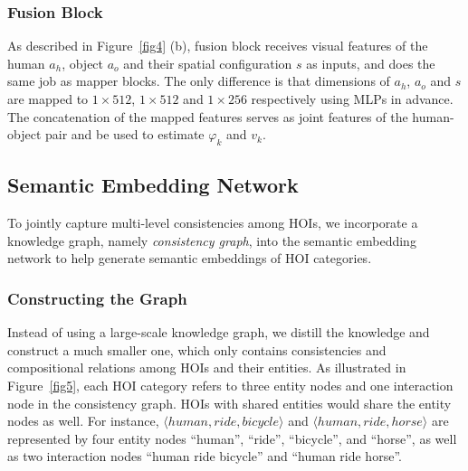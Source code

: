 \documentclass[sigconf,screen]{acmart}
\begin{document}
\subsubsection{Fusion Block}\label{3.2.2}

As described in Figure~\ref{fig4} (b), fusion block receives visual features of the human $a_h$, object $a_o$ and their spatial configuration $s$ as inputs, and does the same job as mapper blocks. The only difference is that dimensions of $a_h$, $a_o$ and $s$ are mapped to $1 \times 512$, $1 \times 512$ and $1 \times 256$ respectively using MLPs in advance. The concatenation of the mapped features serves as joint features of the human-object pair and be used to estimate $\varphi_k$ and $v_k$.

\subsection{Semantic Embedding Network}

To jointly capture multi-level consistencies among HOIs, we incorporate a knowledge graph, namely \textit{consistency graph}, into the semantic embedding network to help generate semantic embeddings of HOI categories.

\subsubsection{Constructing the Graph}

Instead of using a large-scale knowledge graph, we distill the knowledge and construct a much smaller one, which only contains consistencies and compositional relations among HOIs and their entities. As illustrated in Figure~\ref{fig5}, each HOI category refers to three entity nodes and one interaction node in the consistency graph. HOIs with shared entities would share the entity nodes as well. For instance, $\langle human, ride, bicycle \rangle$ and $\langle human, ride, horse \rangle$ are represented by four entity nodes ``human'', ``ride'', ``bicycle'', and ``horse'', as well as two interaction nodes ``human ride bicycle'' and ``human ride horse''.
\end{document}
